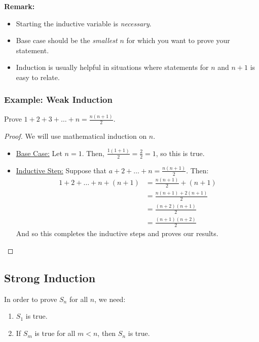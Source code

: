 \documentclass[letterpaper]{article}
\begin{document}
\textbf{Remark:}
\begin{itemize}
    \item Starting the inductive variable is \emph{necessary}.
    \item Base case should be the \emph{smallest} $n$ for which you want to prove your statement.
    \item Induction is usually helpful in situations where statements for $n$ and $n + 1$ is easy to relate. 
\end{itemize}

\subsubsection{Example: Weak Induction}
Prove $1 + 2 + 3 + \dots + n = \frac{n(n + 1)}{2}$. 

\begin{proof}
    We will use mathematical induction on $n$. 
    \begin{itemize}
        \item[\mdiamond] \underline{Base Case:} Let $n = 1$. Then, $\frac{1(1 + 1)}{2} = \frac{2}{2} = 1$, so this is true.
        \item[\mdiamond] \underline{Inductive Step:} Suppose that $a + 2 + \dots + n = \frac{n(n + 1)}{2}$. Then:
        \begin{equation*}
            \begin{aligned}
                1 + 2 + \dots + n + (n + 1) &= \frac{n(n + 1)}{2} + (n + 1) \\ 
                    &= \frac{n(n + 1) + 2(n + 1)}{2} \\ 
                    &= \frac{(n + 2)(n + 1)}{2} \\ 
                    &= \frac{(n + 1)(n + 2)}{2}
            \end{aligned}
        \end{equation*}  
        And so this completes the inductive steps and proves our results. \qedhere
    \end{itemize}
\end{proof}

\subsection{Strong Induction}
In order to prove $S_n$ for all $n$, we need:
\begin{enumerate}
    \item $S_1$ is true.
    \item If $S_m$ is true for all $m < n$, then $S_n$ is true.
\end{enumerate}
\end{document}
